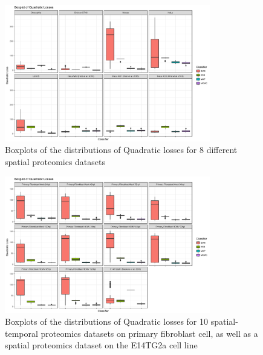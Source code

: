 \documentclass[12pt,english]{article}\usepackage[]{graphicx}\usepackage[]{color}
\begin{document}
\begin{figure}[ht]
  \centering
  \includegraphics[width=0.8\textwidth]{Quadlosscompare1.pdf}
  \caption{Boxplots of the distributions of Quadratic losses
    for 8 different spatial proteomics datasets}
  \label{figure::quadloss1}
\end{figure}

\begin{figure}[ht]
  \centering
  \includegraphics[width=0.8\textwidth]{Quadlosscompare2.pdf}
  \caption{Boxplots of the distributions of Quadratic losses
    for 10 spatial-temporal proteomics datasets on primary fibroblast cell,
    as well as a spatial proteomics dataset on the E14TG2a cell line}
  \label{figure::quadloss2}
\end{figure}


\clearpage
\end{document}

